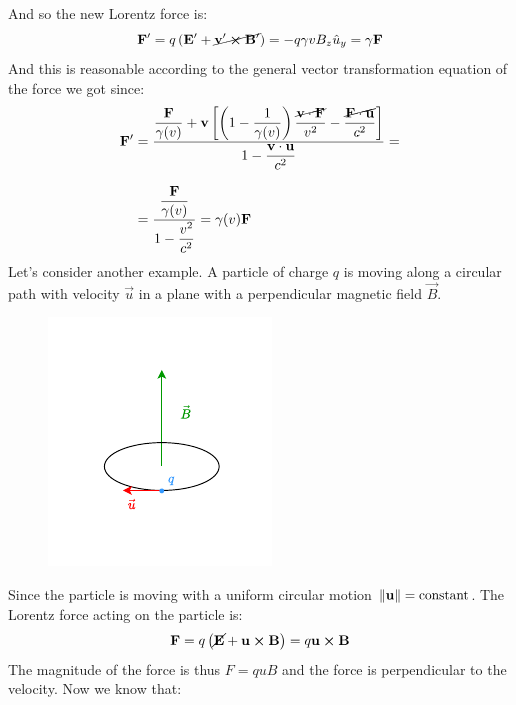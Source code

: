 And so the new Lorentz force is:
\begin{equation}
  \vb{F}' = q\left(\vb{E}' + \cancel{\vb{v}'\cross \vb{B}'}\right) = -q\gamma v B_z \hat{u}_y = \gamma \vb{F}
\end{equation}
And this is reasonable according to the general vector transformation equation of the force we got since:
\begin{equation}
  \begin{split}
    \vb{F}' &= \dfrac{\dfrac{\vb{F}}{\gamma (v)} + \vb{v}\left[\left(1- \dfrac{1}{\gamma(v)}\right)\dfrac{\cancel{\vb{v}\cdot \vb{F}}}{v^2}-\dfrac{\cancel{\vb{F}\cdot \vb{u}}}{c^2}\right]}{1-\dfrac{\vb{v}\cdot\vb{u}}{c^2}} = \\[8pt]
    &= \dfrac{\dfrac{\vb{F}}{\gamma(v)}}{1-\dfrac{v^2}{c^2}} = \gamma(v)\vb{F}
  \end{split}
\end{equation}
Let's consider another example. A particle of charge $q$ is moving along a circular path with velocity $\vec{u}$ in a plane with a perpendicular magnetic field $\vec{B}$.
\begin{figure}[H]
  \centering
  \includegraphics[width=0.6\linewidth]{res/svg/ciclotronic_motion.drawio}
\end{figure}
Since the particle is moving with a uniform circular motion $\norm{\vb{u}} = \text{constant}$. The Lorentz force acting on the particle is:
\begin{equation}
  \vb{F} = q\left(\cancel{\vb{E}} + \vb{u} \cross \vb{B}\right) = q\vb{u} \cross \vb{B}
\end{equation}
The magnitude of the force is thus $F = quB$ and the force is perpendicular to the velocity. Now we know that:
